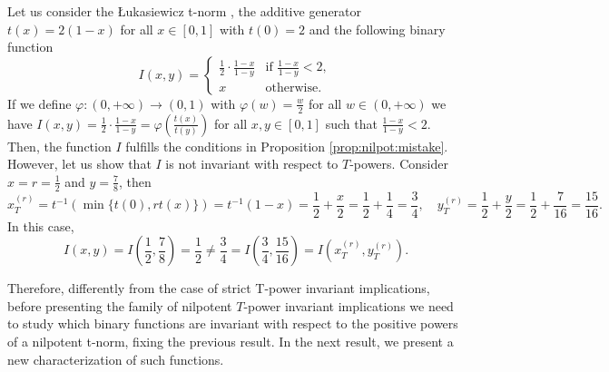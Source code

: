 \begin{example}\label{example:nilpot:counterexample}
	Let us consider the Łukasiewicz t-norm \TLK, the additive generator $t(x)=2(1-x)$ for all $ x \in [0,1]$ with $t(0)=2$ and the following binary function
	\begin{equation*}
		I(x,y) =\left\{ \begin{array}{ll}
			\frac{1}{2} \cdot \frac{1-x}{1-y} & \text{if } \frac{1-x}{1-y}<2,\\
			x &   \text{otherwise}.
		\end{array}
		\right.
	\end{equation*}
	If we define $\varphi:(0,+\infty) \to (0,1)$ with $\varphi(w)=\frac{w}{2}$ for all $w \in (0,+\infty)$ we have $I(x,y)= \frac{1}{2} \cdot \frac{1-x}{1-y} =\varphi \left( \frac{t(x)}{t(y)} \right)$ for all $x,y \in [0,1]$ such that $\frac{1-x}{1-y}<2$. Then, the function $I$ fulfills the conditions in Proposition \ref{prop:nilpot:mistake}. However, let us show that $I$ is not invariant with respect to $T$-powers. Consider $x=r=\frac{1}{2}$ and $y = \frac{7}{8}$, then
	$$ x_T^{(r)} = t^{-1}(\min\{t(0),rt(x)\})= t^{-1}(1-x) = \frac{1}{2}+ \frac{x}{2}=\frac{1}{2} + \frac{1}{4}=\frac{3}{4}, \quad y_T^{(r)} = \frac{1}{2} +\frac{y}{2}=\frac{1}{2} + \frac{7}{16} = \frac{15}{16}.$$ 
	In this case,
	$$I(x,y)=I\left(\frac{1}{2},\frac{7}{8}\right) = \frac{1}{2} \not = \frac{3}{4} = I\left(\frac{3}{4}, \frac{15}{16} \right) = I\left(x_T^{(r)},y_T^{(r)}\right).$$
\end{example}

Therefore, differently from the case of strict T-power invariant implications, before presenting the family of nilpotent $T$-power invariant implications we need to study which binary functions are invariant with respect to the positive powers of a nilpotent t-norm, fixing the previous result. In the next result, we present a new characterization of such functions.

